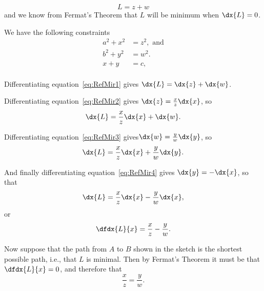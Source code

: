 


  \begin{equation}
    \label{eq:RefMir1} L=z+w
  \end{equation}
  and we know from Fermat's Theorem that $L$ will be minimum when
  $\dx{L}=0$.

   We have the following  constraints
   \begin{align}
    \label{eq:RefMir2}  a^2+x^2&=z^2, \text{ and}\\
    \label{eq:RefMir3} b^2+y^2&=w^2.\\
    \label{eq:RefMir4} x+y&=c,\\
  \end{align}


  Differentiating equation~\ref{eq:RefMir1} gives $\dx{L} = \dx{z}+\dx{w}$.

  Differentiating equation~\ref{eq:RefMir2} gives
  $\dx{z}=\frac{x}{z}\dx{x}$, so
  $$
  \dx{L} = \frac{x}{z}\dx{x}+\dx{w}.
  $$

  Differentiating equation~\ref{eq:RefMir3}
  gives$\dx{w}=\frac{y}{w}\dx{y}$, so
  $$
  \dx{L} = \frac{x}{z}\dx{x}+\frac{y}{w}\dx{y}.
  $$

  And finally differentiating equation~\ref{eq:RefMir4} gives $\dx{y} =
  -\dx{x}$, so that
  $$
  \dx{L} = \frac{x}{z}\dx{x}-\frac{y}{w}\dx{x},
  $$
  or
  $$
  \dfdx{L}{x} = \frac{x}{z}-\frac{y}{w}.
  $$


  Now suppose that the path from $A$ to $B$ shown in the sketch is the
  shortest possible path, i.e., that $L$ is minimal. Then by Fermat's
  Theorem it must be that $\dfdx{L}{x}=0$, and therefore that
  $$
  \frac{x}{z}=\frac{y}{w}.
  $$

